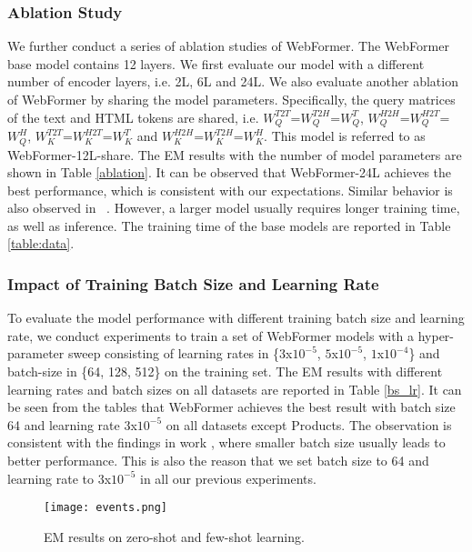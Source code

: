 \documentclass[sigconf]{acmart}
\begin{document}
\subsubsection{Ablation Study}
We further conduct a series of ablation studies of WebFormer. The WebFormer base model contains 12 layers. We first evaluate our model with a different number of encoder layers, i.e. 2L, 6L and 24L. We also evaluate another ablation of WebFormer by sharing the model parameters. Specifically, the query matrices of the text and HTML tokens are shared, i.e. $W_Q^{T2T}$=$W_Q^{T2H}$=$W_Q^T$, $W_Q^{H2H}$=$W_Q^{H2T}$=$W_Q^H$, $W_K^{T2T}$=$W_K^{H2T}$=$W_K^T$ and $W_K^{H2H}$=$W_K^{T2H}$=$W_K^H$. This model is referred to as WebFormer-12L-share. The EM results with the number of model parameters are shown in Table \ref{ablation}. It can be observed that WebFormer-24L achieves the best performance, which is consistent with our expectations. Similar behavior is also observed in ~\cite{DevlinCLT19,AinslieOACFPRSW20}. However, a larger model usually requires longer training time, as well as inference. The training time of the base models are reported in Table \ref{table:data}.

\subsubsection{Impact of Training Batch Size and Learning Rate}
To evaluate the model performance with different training batch size and learning rate,
we conduct experiments to train a set of WebFormer models with a hyper-parameter sweep consisting of learning rates in \{$3$x$10^{-5}$, $5$x$10^{-5}$, $1$x$10^{-4}$\} and batch-size in \{64, 128, 512\} on the training set.
The EM results with different learning rates and batch sizes on all datasets are reported in Table \ref{bs_lr}.
It can be seen from the tables that WebFormer achieves the best result with batch size 64 and learning rate $3$x$10^{-5}$ on all datasets except Products. The observation is consistent with the findings in work \cite{WangYKSSSYE20}, where smaller batch size usually leads to better performance.
This is also the reason that we set batch size to 64 and learning rate to $3$x$10^{-5}$ in all our previous experiments.
\begin{figure}
\centering
\texttt{[image: events.png]}
\caption{EM results on zero-shot and few-shot learning.} \label{fig:generalization}
\end{figure}
\end{document}
